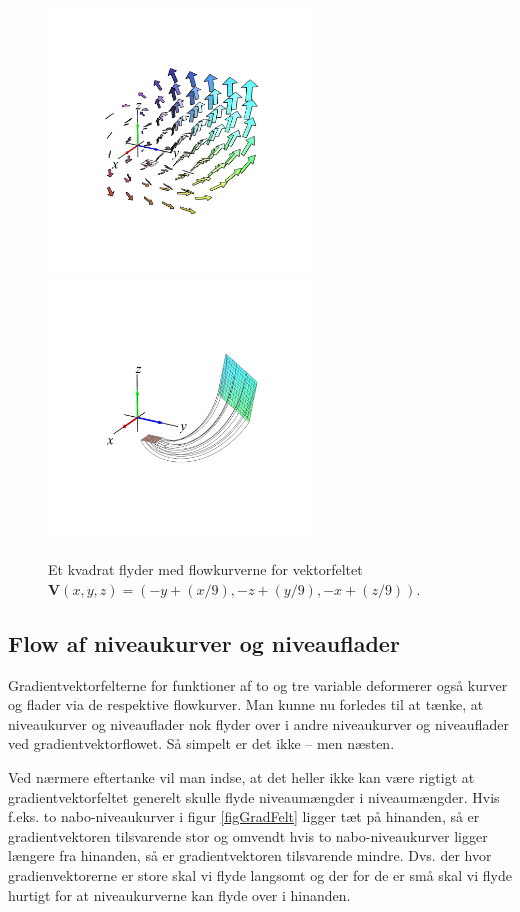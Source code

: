 \begin{figure}[h]
\centerline{\includegraphics[height=70mm]{FIGS/plotVFfladeflow1}\includegraphics[height=70mm]{FIGS/plotVFfladeflow2}}
\begin{center}
\caption{\small{Et kvadrat flyder med flowkurverne for vektorfeltet $\mathbf{V}(x,y,z)= (-y + (x/9), -z+(y/9), -x + (z/9))$.}}
\label{figVFfladeFlow}
\end{center}
\end{figure}


\subsection{Flow af niveaukurver og niveauflader} \label{secLevelFlow}
Gradientvektorfelterne for funktioner af to og tre variable deformerer også kurver og flader via de respektive flowkurver.
Man kunne nu forledes til at  tænke, at niveaukurver og niveauflader nok flyder over i andre niveaukurver og niveauflader ved gradientvektorflowet. Så simpelt er det ikke -- men næsten.

\begin{think}
Ved nærmere eftertanke vil man indse, at det heller ikke kan være rigtigt at gradientvektorfeltet generelt skulle flyde niveaumængder i niveaumængder. Hvis f.eks. to nabo-niveaukurver i figur \ref{figGradFelt} ligger tæt på hinanden,  så er gradientvektoren tilsvarende stor og omvendt hvis to nabo-niveaukurver ligger længere fra hinanden,  så er gradientvektoren tilsvarende mindre. Dvs. der hvor gradienvektorerne er store skal vi flyde langsomt og der for de er små skal vi flyde hurtigt for at niveaukurverne kan flyde over i hinanden.
\end{think}


